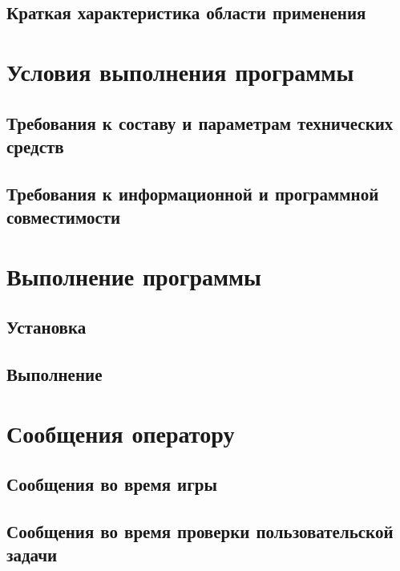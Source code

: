 \documentclass[draft]{article}
\begin{document}
\subsection{Краткая характеристика области применения}
\newpage
\section{Условия выполнения программы}
\subsection{Требования к составу и параметрам технических средств}
\subsection{Требования к информационной и программной совместимости}
\newpage
\section{Выполнение программы}
\subsection{Установка}
\subsection{Выполнение}
\newpage
\section{Сообщения оператору}
\subsection{Сообщения во время игры}
\subsection{Сообщения во время проверки пользовательской задачи}
\newpage
{}
\end{document}
